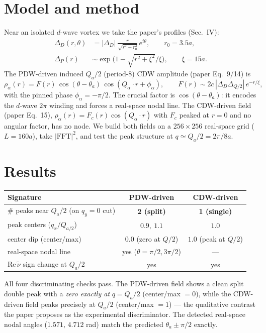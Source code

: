 \documentclass[11pt]{article}
\begin{document}
\section{Model and method}
Near an isolated $d$-wave vortex we take the paper's profiles (Sec.~IV):
\begin{align}
\Delta_D(r,\theta) &= |\Delta_D|\,\frac{r}{\sqrt{r^2+r_0^2}}\,e^{i\theta},
   \qquad r_0 = 3.5a,\\
\Delta_P(r) &\sim \exp\!\big(1-\sqrt{r^2+\xi^2}/\xi\big),\qquad \xi = 15a.
\end{align}
The PDW-driven induced $Q_a/2$ (period-8) CDW amplitude (paper Eq.~9/14) is
\begin{equation}
\rho_\alpha(r) = F(r)\,\cos(\theta-\theta_a)\,\cos(Q_\alpha\!\cdot r + \phi_\alpha),
\qquad F(r)\sim 2c\,|\Delta_D\Delta_{Q/2}|\,e^{-r/\xi},
\end{equation}
with the pinned phase $\phi_\alpha=-\pi/2$. The crucial factor is
$\cos(\theta-\theta_a)$: it encodes the $d$-wave $2\pi$ winding and forces a
real-space nodal line. The CDW-driven field (paper Eq.~15),
$\rho_\alpha(r)=F_c(r)\cos(Q_\alpha\!\cdot r)$ with $F_c$ peaked at $r=0$ and no
angular factor, has no node. We build both fields on a $256\times256$ real-space
grid ($L=160a$), take $|\mathrm{FFT}|^2$, and test the peak structure at
$q\simeq Q_a/2 = 2\pi/8a$.

\section{Results}
\begin{center}
\begin{tabular}{lcc}
\hline
Signature & PDW-driven & CDW-driven \\
\hline
\# peaks near $Q_a/2$ (on $q_y=0$ cut) & \textbf{2 (split)} & \textbf{1 (single)} \\
peak centers ($q_x/Q_{a/2}$) & $0.9,\ 1.1$ & $1.0$ \\
center dip (center/max) & $0.0$ (zero at $Q/2$) & $1.0$ (peak at $Q/2$) \\
real-space nodal line & yes ($\theta=\pi/2,3\pi/2$) & --- \\
$\mathrm{Re}\,\tilde\nu$ sign change at $Q_a/2$ & yes & yes \\
\hline
\end{tabular}
\end{center}

All four discriminating checks pass. The PDW-driven field shows a clean split
double peak with a \emph{zero exactly at} $q=Q_a/2$ (center/max $=0$), while the
CDW-driven field peaks precisely at $Q_a/2$ (center/max $=1$) --- the qualitative
contrast the paper proposes as the experimental discriminator. The detected
real-space nodal angles ($1.571,\,4.712$ rad) match the predicted
$\theta_a\pm\pi/2$ exactly.
\end{document}

